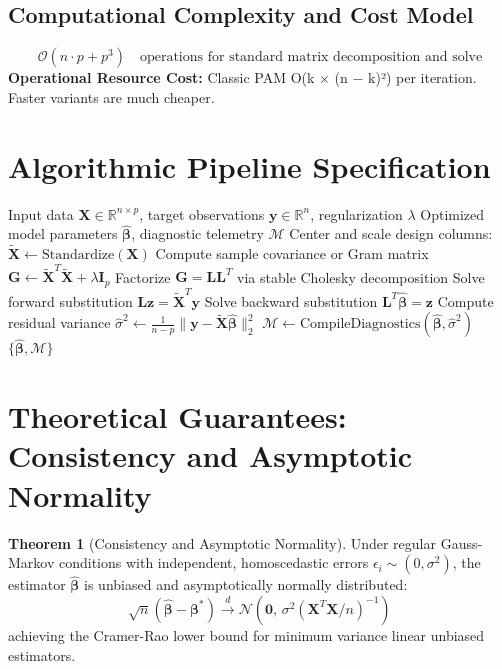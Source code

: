 \documentclass[11pt,a4paper]{article}
\theoremstyle{definition}
\newtheorem{theorem}{\textbf{Theorem}}[section]
\begin{document}
\subsection{Computational Complexity and Cost Model}
\begin{equation}
\mathcal{O}(n \cdot p + p^3) \quad \text{operations for standard matrix decomposition and solve}
\end{equation}
\textbf{Operational Resource Cost:} Classic PAM O(k × (n − k)²) per iteration. Faster variants are much cheaper.

\section{Algorithmic Pipeline Specification}

\begin{algorithm}[H]
\caption{k-medoids Execution}
\begin{algorithmic}[1]
\Require Input data $\mathbf{X} \in \mathbb{R}^{n \times p}$, target observations $\mathbf{y} \in \mathbb{R}^n$, regularization $\lambda$
\Ensure Optimized model parameters $\hat{\boldsymbol{\beta}}$, diagnostic telemetry $\mathcal{M}$
\State Center and scale design columns: $\tilde{\mathbf{X}} \gets \text{Standardize}(\mathbf{X})$
\State Compute sample covariance or Gram matrix $\mathbf{G} \gets \tilde{\mathbf{X}}^T \tilde{\mathbf{X}} + \lambda \mathbf{I}_p$
\State Factorize $\mathbf{G} = \mathbf{L} \mathbf{L}^T$ via stable Cholesky decomposition
\State Solve forward substitution $\mathbf{L} \mathbf{z} = \tilde{\mathbf{X}}^T \mathbf{y}$
\State Solve backward substitution $\mathbf{L}^T \hat{\boldsymbol{\beta}} = \mathbf{z}$
\State Compute residual variance $\hat{\sigma}^2 \gets \frac{1}{n - p} \| \mathbf{y} - \tilde{\mathbf{X}} \hat{\boldsymbol{\beta}} \|_2^2$
\State $\mathcal{M} \gets \text{CompileDiagnostics}(\hat{\boldsymbol{\beta}}, \hat{\sigma}^2)$
\State \Return $\{\hat{\boldsymbol{\beta}}, \mathcal{M}\}$
\end{algorithmic}
\end{algorithm}

\section{Theoretical Guarantees: Consistency and Asymptotic Normality}

\begin{theorem}[Consistency and Asymptotic Normality]
Under regular Gauss-Markov conditions with independent, homoscedastic errors $\epsilon_i \sim (0, \sigma^2)$, the estimator $\hat{\boldsymbol{\beta}}$ is unbiased and asymptotically normally distributed:
\begin{equation}
\sqrt{n}(\hat{\boldsymbol{\beta}} - \boldsymbol{\beta}^*) \xrightarrow{d} \mathcal{N}\left(\mathbf{0}, \, \sigma^2 (\mathbf{X}^T \mathbf{X} / n)^{-1}\right)
\end{equation}
achieving the Cramer-Rao lower bound for minimum variance linear unbiased estimators.
\end{theorem}
\end{document}
